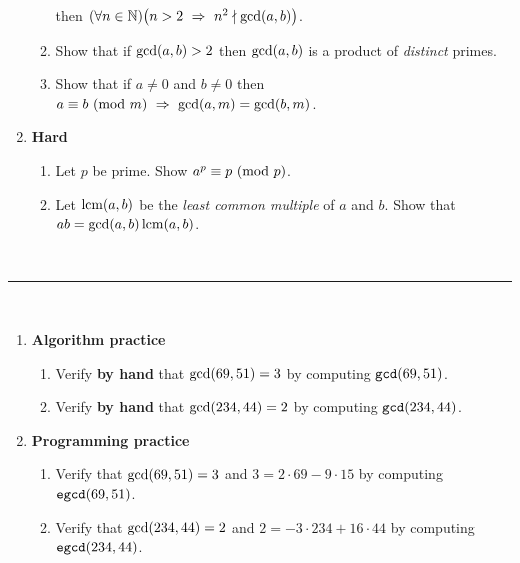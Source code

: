 \begin{enumerate}
\begin{enumerate}
                then $\pn*{\forall n \in \N}\pn*{n > 2 \implies n^2 \ndivides \gcd\pn*{a, b}}$.
            \item
                Show that if $\gcd\pn*{a, b} > 2$
                then $\gcd\pn*{a, b}$ is a product of \emph{distinct} primes.
            \item
                Show that if $a \neq 0$ and $b \neq 0$
                then $\modulo{a}{b}{m} \implies \gcd\pn*{a, m} = \gcd\pn*{b, m}$.
        \end{enumerate}
    \item \textbf{Hard}
        \begin{enumerate}
            \item
                Let $p$ be prime. Show $\modulo{a^p}{p}{p}$.
            \item
                Let $\lcm\pn*{a, b}$ be the \emph{least common multiple} of $a$ and $b$.
                Show that $ab = \gcd\pn*{a, b}\lcm\pn*{a, b}$.
        \end{enumerate}
\end{enumerate}

~\\
\hrule
~\\

\begin{enumerate}
    \item \textbf{Algorithm practice}
        \begin{enumerate}
            \item
                Verify \textbf{by hand} that $\gcd\pn*{69, 51} = 3$
                by computing $\texttt{gcd}\pn*{69, 51}$.
            \item
                Verify \textbf{by hand} that $\gcd\pn*{234, 44} = 2$
                by computing $\texttt{gcd}\pn*{234, 44}$.
        \end{enumerate}
    \item \textbf{Programming practice}
        \begin{enumerate}
            \item
                Verify that $\gcd\pn*{69, 51} = 3$ and $3 = 2 \cdot 69 - 9 \cdot 15$
                by computing $\texttt{egcd}\pn*{69, 51}$.
            \item
                Verify that $\gcd\pn*{234, 44} = 2$ and $2 = -3 \cdot 234 + 16 \cdot 44$
                by computing $\texttt{egcd}\pn*{234, 44}$.
        \end{enumerate}
\end{enumerate}

